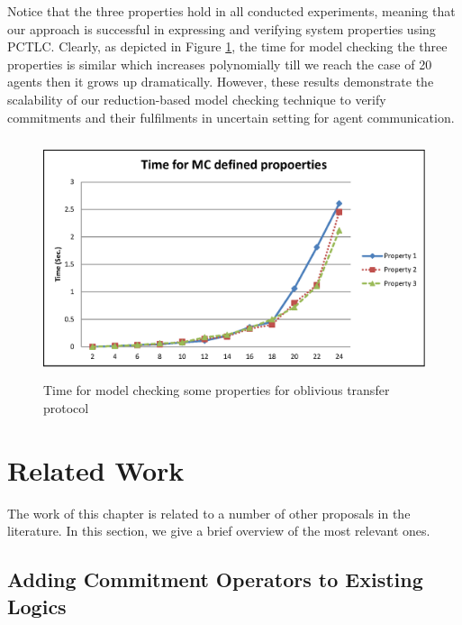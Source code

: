 Notice that the three properties hold in all conducted
experiments, meaning that our approach is successful in expressing
and verifying system  properties using PCTLC. Clearly, as depicted
in Figure \ref{fig:MC-time-properties-cha3}, the time for model
checking the three properties is similar which increases
polynomially till we reach the case of 20 agents then it grows up
dramatically. However, these results demonstrate the scalability
of our reduction-based model checking technique to verify
commitments and their fulfilments in uncertain setting for agent
communication.


\begin{figure}[!ht]
\begin{center}
\includegraphics [width=13cm, height=7cm]{chap3/img/three-properties-time.eps}
  \caption{Time for model checking some properties for oblivious transfer protocol}
\label{fig:MC-time-properties-cha3}
\end{center}
\end{figure}

\section{Related Work} \label{sec:related-work-cha3}

The work of this chapter is related to a number of other proposals in the
literature. In this section, we give a brief overview of the most
relevant ones.

\subsection{Adding Commitment Operators to Existing Logics} \label{sec:related work Extending existing Logics}

